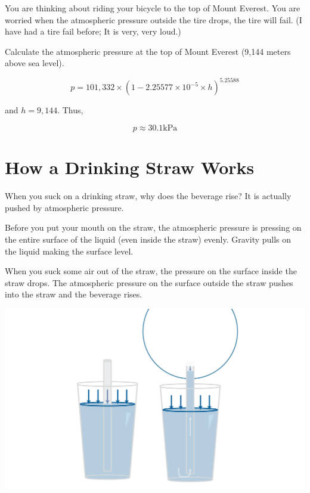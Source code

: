 \begin{Exercise}[title={Atmospheric Pressure},  label=atmos_pressure]
  
You are thinking about riding your bicycle to the top of Mount Everest.  You are worried when the atmospheric pressure outside the tire drops,  the tire will fail.  
(I have had a tire fail before; It is very, very loud.)  

Calculate the atmospheric pressure at the top of Mount Everest (9,144 meters above sea level).

\end{Exercise}
\begin{Answer}[ref=atmos_pressure]

$$p = 101,332 \times \left(1 - 2.25577 \times 10^{-5} \times h\right)^{5.25588}$$

and $h = 9,144$.  Thus,

$$p \approx 30.1 \text{kPa}$$

\end{Answer}

\section{How a Drinking Straw Works}

When you suck on a drinking straw,  why does the beverage rise?  
It is actually pushed by atmospheric pressure. 

Before you put your mouth on the straw,  the atmospheric pressure is pressing on the 
entire surface of the liquid (even inside the straw) evenly.   Gravity pulls on the liquid making the surface
level.

When you suck some air out of the straw,  the pressure on the surface inside the straw drops.  The atmospheric pressure on the surface outside the straw pushes into the straw and the beverage rises.

\includegraphics[width=\textwidth]{straw.png}

